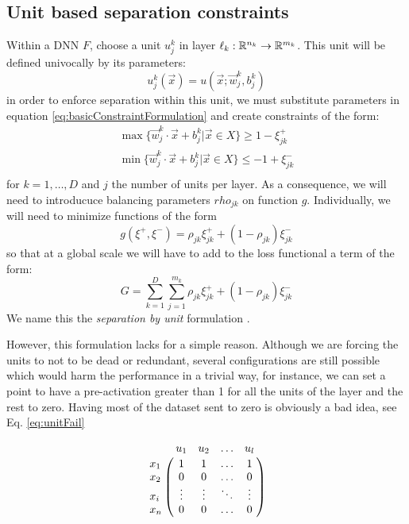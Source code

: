 \subsection{Unit based separation constraints \SepUnit}\label{subsec:sepUnit}
Within a \ReLU DNN $F$, choose a unit $u_j^k$ in layer $\ell_k:\mathbb{R}^{n_k}\rightarrow\mathbb{R}^{m_k}$. This unit will be defined univocally by its parameters:
\begin{equation}\label{eq:unitSepParameterWriting}
    u^k_j(\vec{x}) = u(\vec{x};\vec{w}^k_j,b^k_j)
\end{equation}
in order to enforce separation within this unit, we must substitute parameters in equation \ref{eq:basicConstraintFormulation} and create constraints of the form:
\begin{equation}
    \begin{array}{lcl}
    \max\{\vec{w}^k_j\cdot\vec{x}+b^k_j|\vec{x}\in X\}\geq 1-\xi^{+}_{jk}\\
    \min\{\vec{w}^k_j\cdot\vec{x}+b^k_j|\vec{x}\in X\}\leq -1+\xi^{-}_{jk}\\
\end{array}
\end{equation}
for $k=1,\ldots,D$ and $j$ the number of units per layer. As a consequence, we will need to introducuce balancing parameters $rho_{jk}$ on function $g$. Individually, we will need to minimize functions of the form
\begin{equation}
    g(\xi^{+},\xi^{-}) = \rho_{jk}\xi^{+}_{jk}+(1-\rho_{jk})\xi^{-}_{jk}
\end{equation}
so that at a global scale we will have to add to the loss functional a term of the form:
\begin{equation}\label{eq:constraintLossForUnitSeparation}
    G = \sum_{k=1}^{D}\sum_{j=1}^{m_k}\rho_{jk}\xi^{+}_{jk}+(1-\rho_{jk})\xi^{-}_{jk}
\end{equation}
We name this the \emph{separation by unit} formulation \SepUnit.

However, this formulation lacks for a simple reason. Although we are forcing the units to not to be dead or redundant, several configurations are still possible which would harm the performance in a trivial way, for instance, we can set a point to have a pre-activation greater than 1 for all the units of the layer and the rest to zero. Having most of the dataset sent to zero is obviously a bad idea, see Eq. \ref{eq:unitFail}

\begin{equation}\label{eq:unitFail}
    \bordermatrix{ &u_1& u_2&\ldots &u_l\cr
                x_1& 1 &  1  & \ldots & 1\cr
                x_2& 0  &  0 & \ldots & 0\cr
                x_i& \vdots & \vdots & \ddots & \vdots\cr
                x_n& 0  &   0       &\ldots & 0} \\[15pt]
\end{equation}


